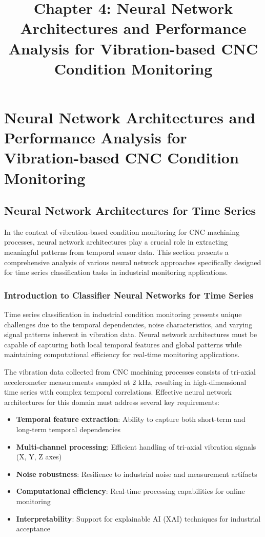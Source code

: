 \documentclass[12pt]{article}
\title{Chapter 4: Neural Network Architectures and Performance Analysis for Vibration-based CNC Condition Monitoring}
\author{}
\date{}
\begin{document}
\chapter{Neural Network Architectures and Performance Analysis for Vibration-based CNC Condition Monitoring}

\section{Neural Network Architectures for Time Series}

In the context of vibration-based condition monitoring for CNC machining processes, neural network architectures play a crucial role in extracting meaningful patterns from temporal sensor data. This section presents a comprehensive analysis of various neural network approaches specifically designed for time series classification tasks in industrial monitoring applications.

\subsection{Introduction to Classifier Neural Networks for Time Series}

Time series classification in industrial condition monitoring presents unique challenges due to the temporal dependencies, noise characteristics, and varying signal patterns inherent in vibration data. Neural network architectures must be capable of capturing both local temporal features and global patterns while maintaining computational efficiency for real-time monitoring applications.

The vibration data collected from CNC machining processes consists of tri-axial accelerometer measurements sampled at 2 kHz, resulting in high-dimensional time series with complex temporal correlations. Effective neural network architectures for this domain must address several key requirements:

\begin{itemize}
    \item \textbf{Temporal feature extraction}: Ability to capture both short-term and long-term temporal dependencies
    \item \textbf{Multi-channel processing}: Efficient handling of tri-axial vibration signals (X, Y, Z axes)
    \item \textbf{Noise robustness}: Resilience to industrial noise and measurement artifacts
    \item \textbf{Computational efficiency}: Real-time processing capabilities for online monitoring
    \item \textbf{Interpretability}: Support for explainable AI (XAI) techniques for industrial acceptance
\end{itemize}
\end{document}
